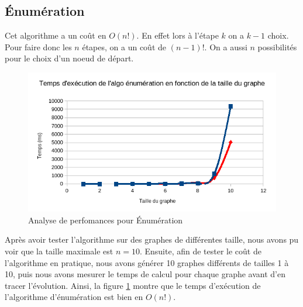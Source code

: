 \documentclass[11pt]{article} \usepackage[top=2cm, bottom=2cm, left=2cm, right=2cm]{geometry}
\begin{document}
\subsection*{\'Enumération}
Cet algorithme a un coût en $O(n!)$. En effet lors à l'étape $k$ on a $k-1$ choix. Pour faire donc les $n$ étapes, on a un coût de $(n-1)!$. On a aussi $n$ possibilités pour le choix d'un noeud de départ.
  \begin{figure}[ht]
\begin{center}
  
  \includegraphics[scale=0.8]{images/exec_enum.png}
  \caption{Analyse de perfomances pour \'Enumération}
  \label{fig:enum}
\end{center}
\end{figure}
Après avoir tester l'algorithme sur des graphes de différentes taille, nous avons pu voir que la taille maximale est $n=10$. Ensuite, afin de tester le coût de l'algorithme en pratique, nous avons générer 10 graphes différents de tailles 1 à 10, puis nous avons mesurer le temps de calcul pour chaque graphe avant d'en tracer l'évolution. Ainsi, la figure \ref{fig:enum} montre que le temps d'exécution de l'algorithme d'énumération est bien en $O(n!)$.
\end{document}
